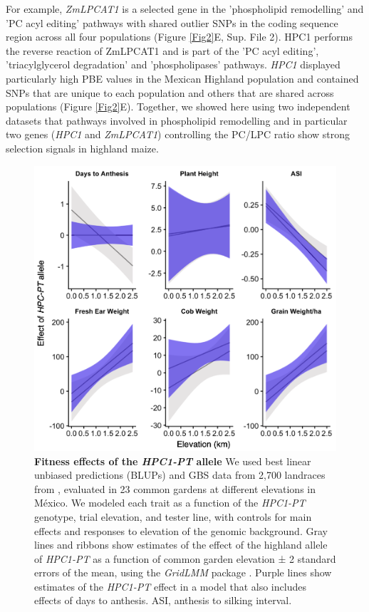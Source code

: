 \documentclass[9pt,twocolumn,twoside,lineno]{biorxiv}
\begin{document}
For example, \textit{ZmLPCAT1} is a selected gene  in the 'phospholipid remodelling' and 'PC acyl editing' pathways with shared outlier SNPs in the coding sequence region across all four populations (Figure \ref{Fig2}E, Sup. File 2). 
HPC1 performs the reverse reaction of ZmLPCAT1 and is part of the 'PC acyl editing', 'triacylglycerol degradation' and 'phospholipases' pathways. 
\textit{HPC1} displayed particularly high PBE values in the Mexican Highland population and contained SNPs that are unique to each population and others that are shared across populations (Figure \ref{Fig2}E). 
Together, we showed here using two independent datasets that pathways involved in phospholipid remodelling and in particular two genes (\textit{HPC1} and \textit{ZmLPCAT1}) controlling the PC/LPC ratio show strong selection signals in highland maize.

\begin{figure}[!ht]
\begin{center}
\includegraphics[width=0.4\paperwidth]{Figures/Fig_4.png}
\caption{\textbf{Fitness effects of the \textit{HPC1-PT} allele} 
We used best linear unbiased predictions (BLUPs) and GBS data from 2,700 landraces from \cite{Gates2019-xu}, evaluated in 23 common gardens at different elevations in México. 
We modeled each trait as a function of the \textit{HPC1-PT} genotype, trial elevation, and tester line, with controls for main effects and responses to elevation of the genomic background. 
Gray lines and ribbons show estimates of the effect of the highland allele of \textit{HPC1-PT} as a function of common garden elevation ± 2 standard errors of the mean, using the \textit{GridLMM} package \cite{Runcie2019-Gr}. 
Purple lines show estimates of the \textit{HPC1-PT} effect in a model that also includes effects of days to anthesis. ASI, anthesis to silking interval.}
\label{Fig4}
\end{center}
\end{figure}
\end{document}
